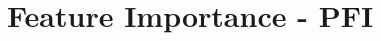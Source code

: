 \documentclass[11pt,compress,t,notes=noshow, aspectratio=169, xcolor=table]{beamer}
\begin{document}


% 
% 
% 

% 


% 

\section{Feature Importance - PFI}

\end{document}
